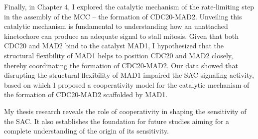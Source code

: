 Finally, in Chapter 4, I explored the catalytic mechanism of the rate-limiting step in the assembly of the MCC -- the formation of CDC20-MAD2. Unveiling this catalytic mechanism is fundamental to understanding how an unattached kinetochore can produce an adequate signal to stall mitosis. Given that both CDC20 and MAD2 bind to the catalyst MAD1, I hypothesized that the structural flexibility of MAD1 helps to position CDC20 and MAD2 closely, thereby coordinating the formation of CDC20-MAD2. Our data showed that disrupting the structural flexibility of MAD1 impaired the SAC signaling activity, based on which I proposed a cooperativity model for the catalytic mechanism of the formation of CDC20-MAD2 scaffolded by MAD1.

My thesis research reveals the role of cooperativity in shaping the sensitivity of the SAC. It also establishes the foundation for future studies aiming for a complete understanding of the origin of its sensitivity.